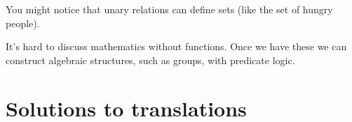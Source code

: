 \documentclass[10pt,a4paper]{article}
\begin{document}
You might notice that unary relations can define sets (like the set of hungry people).


It's hard to discuss mathematics without functions.
Once we have these we can construct algebraic structures, such as groups, with predicate logic.


\newpage

\newcommand{\loves}[1]{\textrm{loves}(#1)}
\newcommand{\person}[1]{\textrm{person}(#1)}
\newcommand{\hungry}[1]{\textrm{hungry}(#1)}

\section{Solutions to translations}
\end{document}
